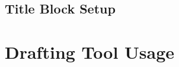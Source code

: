 \documentclass[11 pt, twoside]{article}
\newenvironment{outline*}
{
	\begin{outline}[enumerate]
	}
	{\end{outline}
}
\begin{document}
\subsection{Title Block Setup}
\begin{outline*}

\end{outline*}

\section{Drafting Tool Usage}
\begin{outline*}

\end{outline*}
\end{document}
